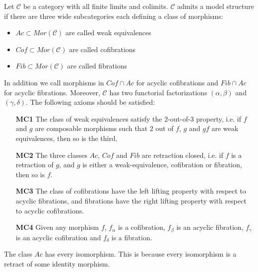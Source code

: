 \documentclass[../thesis.tex]{subfiles}
\begin{document}
            \begin{definition}
                Let $\mathcal{C}$ be a category with all finite limits and colimits. $\mathcal{C}$ admits a model structure if there are three wide subcategories each defining a class of morphisms:
                \begin{itemize}
                    \item $Ac\subset Mor(\mathcal{C})$ are called weak equivalences
                    \item $Cof\subset Mor(\mathcal{C})$ are called cofibrations
                    \item $Fib\subset Mor(\mathcal{C})$ are called fibrations
                \end{itemize}
                In addition we call morphisms in $Cof\cap Ac$ for acyclic cofibrations and $Fib\cap Ac$ for acyclic fibrations. Moreover, $\mathcal{C}$ has two functorial factorizations $(\alpha, \beta)$ and $(\gamma, \delta)$. The following axioms should be satisfied:
                \begin{itemize}
                    \item[\textbf{MC1}] The class of weak equivalences satisfy the $2$-out-of-$3$ property, i.e. if $f$ and $g$ are composable morphisms such that $2$ out of $f$, $g$ and $gf$ are weak equivalences, then so is the third.
                    \item[\textbf{MC2}] The three classes $Ac$, $Cof$ and $Fib$ are retraction closed, i.e. if $f$ is a retraction of $g$, and $g$ is either a weak-equivalence, cofibration or fibration, then so is $f$.
                    \item[\textbf{MC3}] The class of cofibrations have the left lifting property with respect to acyclic fibrations, and fibrations have the right lifting property with respect to acyclic cofibrations.
                    \item[\textbf{MC4}] Given any morphism $f$, $f_\alpha$ is a cofibration, $f_\beta$ is an acyclic fibration, $f_\gamma$ is an acyclic cofibration and $f_\delta$ is a fibration.      
                \end{itemize}
            \end{definition}

            \begin{remark}
                The class $Ac$ has every isomorphism. This is because every isomorphism is a retract of some identity morphism.
            \end{remark}
\end{document}

